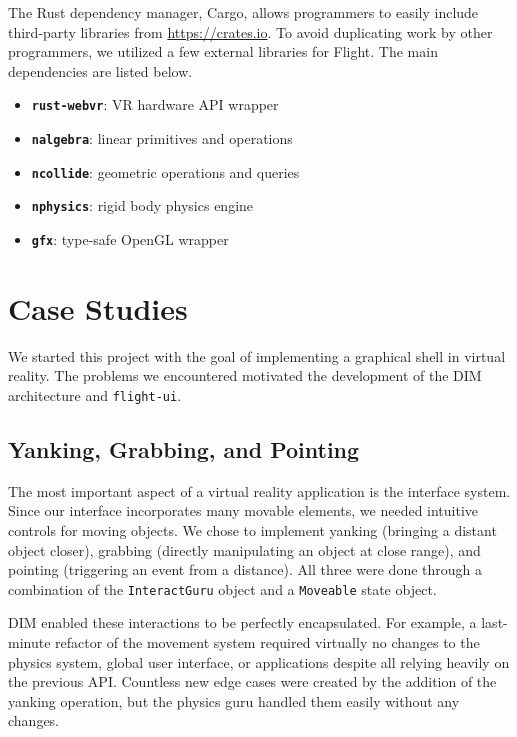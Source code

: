 \documentclass[conference,12pt]{IEEEtran}
\begin{document}
The Rust dependency manager, Cargo, allows programmers to easily include
third-party libraries from \url{https://crates.io}. To avoid duplicating work
by other programmers, we utilized a few external libraries for Flight. The main
dependencies are listed below.
\begin{itemize}
    \item \textbf{\texttt{rust-webvr}}: VR hardware API wrapper
    \item \textbf{\texttt{nalgebra}}: linear primitives and operations
    \item \textbf{\texttt{ncollide}}: geometric operations and queries
    \item \textbf{\texttt{nphysics}}: rigid body physics engine
    \item \textbf{\texttt{gfx}}: type-safe OpenGL wrapper
\end{itemize}

\section{Case Studies}\label{sec:case-studies}

We started this project with the goal of implementing a graphical shell in
virtual reality. The problems we encountered motivated the development of the
DIM architecture and \texttt{flight-ui}.

\subsection{Yanking, Grabbing, and Pointing}

The most important aspect of a virtual reality application is the interface
system. Since our interface incorporates many movable elements, we needed
intuitive controls for moving objects. We chose to implement yanking (bringing a
distant object closer), grabbing (directly manipulating an object at close
range), and pointing (triggering an event from a distance). All three were done
through a combination of the \texttt{InteractGuru} object and a
\texttt{Moveable} state object.

DIM enabled these interactions to be perfectly encapsulated. For example, a
last-minute refactor of the movement system required virtually no changes to the
physics system, global user interface, or applications despite all relying
heavily on the previous API. Countless new edge cases were created by the
addition of the yanking operation, but the physics guru handled them easily
without any changes.
\end{document}
